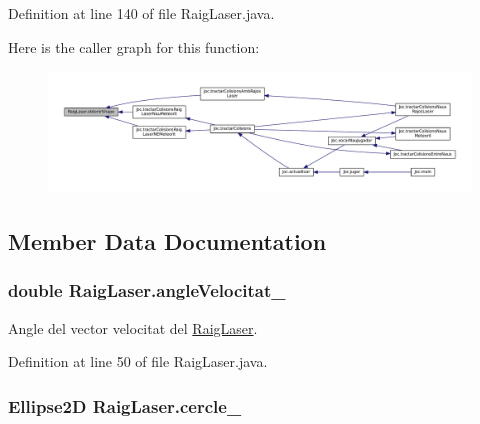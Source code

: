 Definition at line 140 of file Raig\+Laser.\+java.



Here is the caller graph for this function\+:
\nopagebreak
\begin{figure}[H]
\begin{center}
\leavevmode
\includegraphics[width=350pt]{class_raig_laser_abcf16e8249b1e7562d6fbcc6d408e7f4_icgraph}
\end{center}
\end{figure}




\subsection{Member Data Documentation}
\hypertarget{class_raig_laser_a2a0e32ff8599a77e2d1f315924c0da14}{}
\subsubsection[{angle\+Velocitat\+\_\+}]{\setlength{\rightskip}{0pt plus 5cm}double Raig\+Laser.\+angle\+Velocitat\+\_\+\hspace{0.3cm}{\ttfamily [private]}}\label{class_raig_laser_a2a0e32ff8599a77e2d1f315924c0da14}


Angle del vector velocitat del \hyperlink{class_raig_laser}{Raig\+Laser}. 



Definition at line 50 of file Raig\+Laser.\+java.

\hypertarget{class_raig_laser_a48b0b5a92a7424862bf6ebe59c498577}{}
\subsubsection[{cercle\+\_\+}]{\setlength{\rightskip}{0pt plus 5cm}Ellipse2\+D Raig\+Laser.\+cercle\+\_\+\hspace{0.3cm}{\ttfamily [private]}}\label{class_raig_laser_a48b0b5a92a7424862bf6ebe59c498577}


